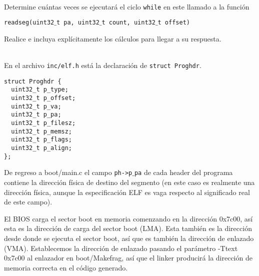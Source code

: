 \documentclass{article}
\begin{document}
\\
Determine cu\'antas veces se ejecutar\'a el 
ciclo {\tt while} en este llamado a la funci\'on 
\begin{center}
{\tt readseg(uint32$\_$t pa, uint32$\_$t count, uint32$\_$t offset)}
\end{center}
Realice e incluya expl\'icitamente los c\'alculos para llegar a su respuesta.

\ \\
En el archivo {\tt inc/elf.h} est\'a la declaraci\'on de {\tt struct Proghdr}.
\begin{verbatim}
struct Proghdr {
  uint32_t p_type;
  uint32_t p_offset;
  uint32_t p_va;
  uint32_t p_pa;
  uint32_t p_filesz;
  uint32_t p_memsz;
  uint32_t p_flags;
  uint32_t p_align;
};
\end{verbatim}

De regreso a boot/main.c el campo {\tt ph->p$\_$pa} de cada header del 
programa contiene la direcci\'on f\/\'isica de destino del segmento (en 
este caso es realmente una direcci\'on f\/\'isica, aunque la especif\/icaci\'on  
ELF es vaga respecto al signif\/icado real de este campo).

El BIOS carga el sector boot en memoria comenzando en la direcci\'on 0x7c00, 
as\'i esta es la direcci\'on de carga del sector boot (LMA). Esta tambi\'en es 
la direcci\'on desde donde se ejecuta el sector boot, as\'i que es tambi\'en la 
direcci\'on de enlazado (VMA). Establecemos la direcci\'on de enlazado pasando el 
par\'ametro -Ttext 0x7c00 al enlazador en boot/Makefrag, as\'i que el linker 
producir\'a la direcci\'on de memoria correcta en el c\'odigo generado.
\end{document}
